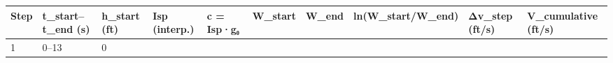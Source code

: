 \documentclass[
  10pt,
]{article}
\begin{document}
\begin{longtable}[]{@{}llllllllll@{}}
\toprule
\begin{minipage}[b]{0.03\columnwidth}\raggedright
Step\strut
\end{minipage} & \begin{minipage}[b]{0.10\columnwidth}\raggedright
t\_start--t\_end (s)\strut
\end{minipage} & \begin{minipage}[b]{0.07\columnwidth}\raggedright
h\_start (ft)\strut
\end{minipage} & \begin{minipage}[b]{0.08\columnwidth}\raggedright
Isp (interp.)\strut
\end{minipage} & \begin{minipage}[b]{0.06\columnwidth}\raggedright
c = Isp·g₀\strut
\end{minipage} & \begin{minipage}[b]{0.05\columnwidth}\raggedright
W\_start\strut
\end{minipage} & \begin{minipage}[b]{0.04\columnwidth}\raggedright
W\_end\strut
\end{minipage} & \begin{minipage}[b]{0.10\columnwidth}\raggedright
ln(W\_start/W\_end)\strut
\end{minipage} & \begin{minipage}[b]{0.09\columnwidth}\raggedright
Δv\_step (ft/s)\strut
\end{minipage} & \begin{minipage}[b]{0.11\columnwidth}\raggedright
V\_cumulative (ft/s)\strut
\end{minipage}\tabularnewline
\midrule
\endhead
\begin{minipage}[t]{0.03\columnwidth}\raggedright
1\strut
\end{minipage} & \begin{minipage}[t]{0.10\columnwidth}\raggedright
0--13\strut
\end{minipage} & \begin{minipage}[t]{0.07\columnwidth}\raggedright
0\strut
\end{minipage} & \begin{minipage}[t]{0.08\columnwidth}\raggedright
\strut
\end{minipage} & \begin{minipage}[t]{0.06\columnwidth}\raggedright
\strut
\end{minipage} & \begin{minipage}[t]{0.05\columnwidth}\raggedright

\end{minipage}
\end{longtable}
\end{document}

